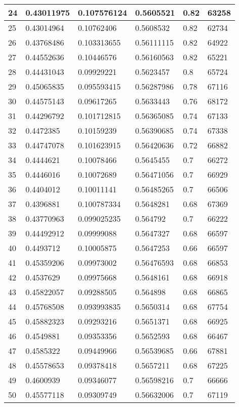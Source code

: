 \begin{longtable}{|l|l|l|l|l|l|}
24 & 0.43011975 & 0.107576124 & 0.5605521 & 0.82 & 63258 \\ \hline 
25 & 0.43014964 & 0.10762406 & 0.5608532 & 0.82 & 62734 \\ \hline 
26 & 0.43768486 & 0.103313655 & 0.56111115 & 0.82 & 64922 \\ \hline 
27 & 0.44552636 & 0.10446576 & 0.56160563 & 0.82 & 65221 \\ \hline 
28 & 0.44431043 & 0.09929221 & 0.5623457 & 0.8 & 65724 \\ \hline 
29 & 0.45065835 & 0.095593415 & 0.56287986 & 0.78 & 67116 \\ \hline 
30 & 0.44575143 & 0.09617265 & 0.5633443 & 0.76 & 68172 \\ \hline 
31 & 0.44296792 & 0.101712815 & 0.56365085 & 0.74 & 67133 \\ \hline 
32 & 0.4472385 & 0.10159239 & 0.56390685 & 0.74 & 67338 \\ \hline 
33 & 0.44747078 & 0.101623915 & 0.56420636 & 0.72 & 66882 \\ \hline 
34 & 0.4444621 & 0.10078466 & 0.5645455 & 0.7 & 66272 \\ \hline 
35 & 0.4446016 & 0.10072689 & 0.56471056 & 0.7 & 66929 \\ \hline 
36 & 0.4404012 & 0.10011141 & 0.56485265 & 0.7 & 66506 \\ \hline 
37 & 0.4396881 & 0.100787334 & 0.5648281 & 0.68 & 67369 \\ \hline 
38 & 0.43770963 & 0.099025235 & 0.564792 & 0.7 & 66222 \\ \hline 
39 & 0.44492912 & 0.09999088 & 0.5647327 & 0.68 & 66597 \\ \hline 
40 & 0.4493712 & 0.10005875 & 0.5647253 & 0.66 & 66597 \\ \hline 
41 & 0.45359206 & 0.09973002 & 0.56476593 & 0.68 & 66853 \\ \hline 
42 & 0.4537629 & 0.09975668 & 0.5648161 & 0.68 & 66918 \\ \hline 
43 & 0.45822057 & 0.09288505 & 0.564898 & 0.68 & 66865 \\ \hline 
44 & 0.45768508 & 0.093993835 & 0.5650314 & 0.68 & 67754 \\ \hline 
45 & 0.45882323 & 0.09293216 & 0.5651371 & 0.68 & 66925 \\ \hline 
46 & 0.4549881 & 0.09353356 & 0.5652593 & 0.68 & 66467 \\ \hline 
47 & 0.4585322 & 0.09449966 & 0.56539685 & 0.66 & 67881 \\ \hline 
48 & 0.45578653 & 0.09378418 & 0.5657211 & 0.68 & 67225 \\ \hline 
49 & 0.4600939 & 0.09346077 & 0.56598216 & 0.7 & 66666 \\ \hline 
50 & 0.45577118 & 0.09309749 & 0.56632006 & 0.7 & 67119 \\ \hline 
\end{longtable}